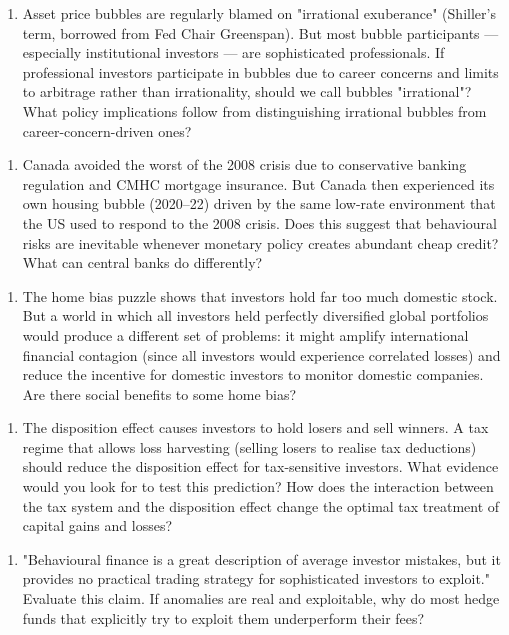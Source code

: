 \documentclass[12pt, letterpaper]{article}
\begin{document}
\begin{enumerate}
\item Asset price bubbles are regularly blamed on "irrational exuberance" (Shiller's term, borrowed from Fed Chair Greenspan). But most bubble participants --- especially institutional investors --- are sophisticated professionals. If professional investors participate in bubbles due to career concerns and limits to arbitrage rather than irrationality, should we call bubbles "irrational"? What policy implications follow from distinguishing irrational bubbles from career-concern-driven ones?
\end{enumerate}

\begin{enumerate}
\item Canada avoided the worst of the 2008 crisis due to conservative banking regulation and CMHC mortgage insurance. But Canada then experienced its own housing bubble (2020--22) driven by the same low-rate environment that the US used to respond to the 2008 crisis. Does this suggest that behavioural risks are inevitable whenever monetary policy creates abundant cheap credit? What can central banks do differently?
\end{enumerate}

\begin{enumerate}
\item The home bias puzzle shows that investors hold far too much domestic stock. But a world in which all investors held perfectly diversified global portfolios would produce a different set of problems: it might amplify international financial contagion (since all investors would experience correlated losses) and reduce the incentive for domestic investors to monitor domestic companies. Are there social benefits to some home bias?
\end{enumerate}

\begin{enumerate}
\item The disposition effect causes investors to hold losers and sell winners. A tax regime that allows loss harvesting (selling losers to realise tax deductions) should reduce the disposition effect for tax-sensitive investors. What evidence would you look for to test this prediction? How does the interaction between the tax system and the disposition effect change the optimal tax treatment of capital gains and losses?
\end{enumerate}

\begin{enumerate}
\item "Behavioural finance is a great description of average investor mistakes, but it provides no practical trading strategy for sophisticated investors to exploit." Evaluate this claim. If anomalies are real and exploitable, why do most hedge funds that explicitly try to exploit them underperform their fees?
\end{enumerate}
\end{document}
